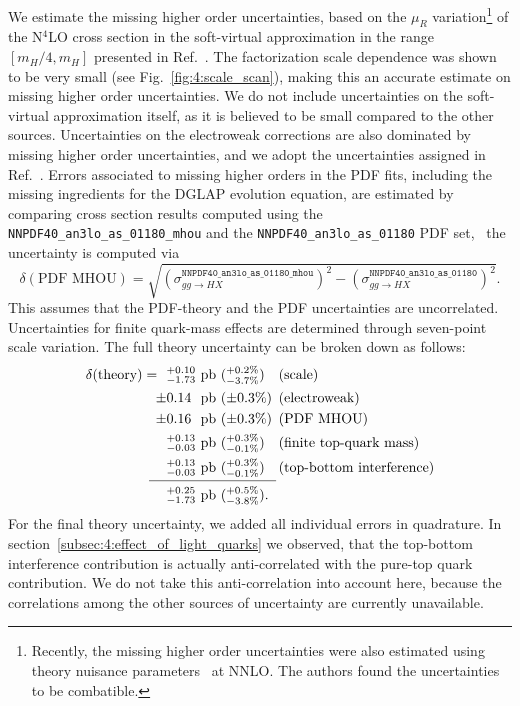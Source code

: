 We estimate the missing higher order uncertainties, based on the $\mu_R$ variation\footnote{Recently, the missing higher order uncertainties were also estimated using theory nuisance parameters~\cite{Lim:2024nsk} at \acs{NNLO}. The authors found the uncertainties to be combatible.} of the N${}^4$LO cross section in the soft-virtual approximation in the range $[m_H/4, m_H]$ presented in Ref.~\cite{Das:2020adl}. The factorization scale dependence was shown to be very small (see Fig.~\ref{fig:4:scale_scan}), making this an accurate estimate on missing higher order uncertainties. We do not include uncertainties on the soft-virtual approximation itself, as it is believed to be small compared to the other sources. Uncertainties on the electroweak corrections are also dominated by missing higher order uncertainties, and we adopt the uncertainties assigned in Ref.~\cite{Becchetti:2020wof}. Errors associated to missing higher orders in the \acs{PDF} fits, including the missing ingredients for the DGLAP evolution equation, are estimated by comparing cross section results computed using the \texttt{NNPDF40\_an3lo\_as\_01180\_mhou} and the \texttt{NNPDF40\_an3lo\_as\_01180} \acs{PDF} set, \ie\ the uncertainty is computed via
\begin{equation}
\delta (\text{PDF MHOU}) = \sqrt{\left(\sigma_{gg \rightarrow HX}^\mathtt{NNPDF40\_an3lo\_as\_01180\_mhou} \right)^2 - \left(\sigma_{gg \rightarrow HX}^\mathtt{NNPDF40\_an3lo\_as\_01180} \right)^2}.
\end{equation}
This assumes that the \acs{PDF}-theory and the \acs{PDF} uncertainties are uncorrelated. Uncertainties for finite quark-mass effects are determined through seven-point scale variation. The full theory uncertainty can be broken down as follows:
\begin{equation}
\begin{alignedat}{5}
\delta(\text{theory}) =\ \  & {}^{+0.10}_{-1.73}\ &&\text{pb    }  && ({}_{-3.7\%}^{+0.2\%}) \quad  &&(\text{scale}) \\
\pm & 0.14\ &&\mathrm{pb}  && (\pm 0.3\%) &&(\text{electroweak}) \\
\pm & 0.16\ &&\mathrm{pb} && (\pm 0.3\%) &&(\text{PDF MHOU}) \\
& {}^{+0.13}_{-0.03}\ &&\mathrm{pb}  && ({}_{-0.1\%}^{+0.3\%}) &&(\text{finite top-quark mass}) \\
& {}^{+0.13}_{-0.03}\ &&\mathrm{pb}  && ({}_{-0.1\%}^{+0.3\%}) &&(\text{top-bottom interference}) \\[-10pt]
& && \hspace{0.3cm} \mathclap{\rule{3.2cm}{0.4pt}}\\[-4pt]
& {}^{+0.25}_{-1.73}  \ &&\mathrm{pb} && ({}_{-3.8\%}^{+0.5\%}).
\end{alignedat}
\end{equation}
For the final theory uncertainty, we added all individual errors in quadrature. In section~\ref{subsec:4:effect_of_light_quarks} we observed, that the top-bottom interference contribution is actually anti-correlated with the pure-top quark contribution. We do not take this anti-correlation into account here, because the correlations among the other sources of uncertainty are currently unavailable.

